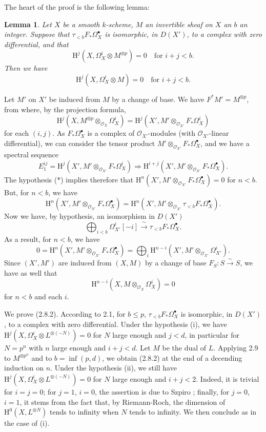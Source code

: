 \documentclass[10pt,reqno]{article}
\renewcommand{\H}{\mathrm{H}}
\renewcommand{\O}{\mathcal{O}}
\newcommand{\ah}{^\ast}
\newcommand{\al}{_\ast}
\newcommand{\bh}{^\bullet}
\theoremstyle{plain}
\newtheorem{lem}[thm]{Lemma}
\theoremstyle{definition}
\begin{document}
\noindent
The heart of the proof is the following lemma:
\begin{lem}
Let $X$ be a smooth $k$-scheme, $M$ an invertible sheaf on $X$ an $b$ an integer. Suppose that
$\tau_{<b}F\al\Omega_X\bh$ is isomorphic, in $D(X')$, to a complex with zero differential,
and that
\[
  \H^j(X,\Omega_X^i\otimes M^{\otimes p})=0\quad\text{for }i+j<b.\tag{$\ast$}
\]
Then we have
\[
  \H^j(X,\Omega_X^i\otimes M)=0\quad\text{for }i+j<b.
\]
\end{lem}
Let $M'$ on $X'$ be induced from $M$ by a change of base. We have $F\ah M'=M^{\otimes p}$, from where,
by the projection formula,
\[
  \H^j(X,M^{\otimes p}\otimes_{\O_X}\Omega_X^i)=\H^j(X',M'\otimes_{\O_{X'}}F\al\Omega_X^i)
\]
for each $(i,j)$. As $F\al\Omega_X\bh$ is a complex of $\O_{X'}$-modules (with $\O_{X'}$-linear 
differential), we can consider the tensor product $M'\otimes_{\O_{X'}}F\al\Omega_X\bh$, and we have
a spectral sequence
\[
  E_1^{ij}=\H^j(X',M'\otimes_{\O_{X'}}F\al\Omega_X^i)\Longrightarrow\H^{i+j}(X',M'\otimes_{\O_{X'}}F\al\Omega_X\bh).
\]
The hypothesis ($\ast$) implies therefore that $\H^n(X',M'\otimes_{\O_{X'}}F\al\Omega_X\bh)=0$ for $n<b$. But,
for $n<b$, we have
\[
  \H^n(X',M'\otimes_{\O_{X'}}F\al\Omega_X\bh)=\H^n(X',M'\otimes_{\O_{X'}}\tau_{<b}F\al\Omega_X\bh).
\]
Now we have, by hypothesis, an isomorphism in $D(X')$
\[
  \bigoplus_{i<b}\Omega_{X'}^i[-i]\xrightarrow{\ \sim\ }\tau_{<b}F\al\Omega_X\bh.
\]
As a result, for $n<b$, we have
\[
  0=\H^n(X',M'\otimes_{\O_{X'}}F\al\Omega_X\bh)=\bigoplus_i\H^{n-i}(X',M'\otimes_{\O_{X'}}\Omega_{X'}^i).
\]
Since $(X',M')$ are induced from $(X,M)$ by a change of base $F_S:S\xrightarrow{\sim}S$, we have as well
that
\[
  \H^{n-i}(X,M\otimes_{\O_X}\Omega_X^i)=0
\]
for $n<b$ and each $i$.

We prove (2.8.2). According to 2.1, for $b\leq p$, $\tau_{<b}F\al\Omega_X\bh$ is isomorphic, in $D(X')$,
to a complex with zero differential. Under the hypothesis (i), we have $\H^j(X,\Omega_X^i\otimes L^{\otimes(-N)})=0$
for $N$ large enough and $j<d$, in particular for $N=p^n$ with $n$ large enough and $i+j<d$. Let $M$ be
the dual of $L$. Applying 2.9 to $M^{\otimes p^n}$ and to $b=\inf(p,d)$, we obtain (2.8.2) at the end
of a decending induction on $n$. Under the hypothesis (ii), we still have $\H^j(X,\Omega_X^i\otimes L^{\otimes(-N)})=0$
for $N$ large enough and $i+j<2$. Indeed, it is trivial for $i=j=0$; for $j=1$, $i=0$, the assertion is due
to Szpiro \cite[Prop.~2]{21}; finally, for $j=0$, $i=1$, it stems from the fact that, by Riemann-Roch,
the dimension of $\H^0(X,L^{\otimes N})$ tends to infinity when $N$ tends to infinity. We then conclude as
in the case of (i).
\end{document}
